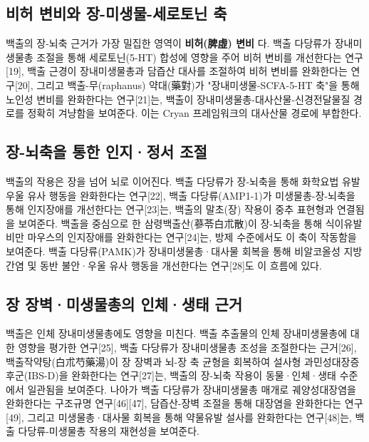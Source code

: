 \documentclass[11pt,oneside]{book}
\begin{document}
\subsection{비허 변비와 장-미생물-세로토닌 축}
백출의 장-뇌축 근거가 가장 밀집한 영역이 \textbf{비허(脾虛) 변비} 다. 백출 다당류가 장내미생물총 조절을 통해 세로토닌(5-HT) 합성에 영향을 주어 비허 변비를 개선한다는 연구[19], 백출 근경이 장내미생물총과 담즙산 대사를 조절하여 비허 변비를 완화한다는 연구[20], 그리고 백출-무(raphanus) 약대(藥對)가 "장내미생물-SCFA-5-HT 축"을 통해 노인성 변비를 완화한다는 연구[21]는, 백출이 장내미생물총-대사산물-신경전달물질 경로를 정확히 겨냥함을 보여준다. 이는 Cryan 프레임워크의 대사산물 경로에 부합한다.

\subsection{장-뇌축을 통한 인지·정서 조절}
백출의 작용은 장을 넘어 뇌로 이어진다. 백출 다당류가 장-뇌축을 통해 화학요법 유발 우울 유사 행동을 완화한다는 연구[22], 백출 다당류(AMP1-1)가 미생물총-장-뇌축을 통해 인지장애를 개선한다는 연구[23]는, 백출의 말초(장) 작용이 중추 표현형과 연결됨을 보여준다. 백출을 중심으로 한 삼령백출산(蔘苓白朮散)이 장-뇌축을 통해 식이유발비만 마우스의 인지장애를 완화한다는 연구[24]는, 방제 수준에서도 이 축이 작동함을 보여준다. 백출 다당류(PAMK)가 장내미생물총·대사물 회복을 통해 비알코올성 지방간염 및 동반 불안·우울 유사 행동을 개선한다는 연구[28]도 이 흐름에 있다.

\subsection{장 장벽·미생물총의 인체·생태 근거}
백출은 인체 장내미생물총에도 영향을 미친다. 백출 추출물의 인체 장내미생물총에 대한 영향을 평가한 연구[25], 백출 다당류가 장내미생물총 조성을 조절한다는 근거[26], 백출작약탕(白朮芍藥湯)이 장 장벽과 뇌-장 축 균형을 회복하여 설사형 과민성대장증후군(IBS-D)을 완화한다는 연구[27]는, 백출의 장-뇌축 작용이 동물·인체·생태 수준에서 일관됨을 보여준다. 나아가 백출 다당류가 장내미생물총 매개로 궤양성대장염을 완화한다는 구조규명 연구[46][47], 담즙산-장벽 조절을 통해 대장염을 완화한다는 연구[49], 그리고 미생물총·대사물 회복을 통해 약물유발 설사를 완화한다는 연구[48]는, 백출 다당류-미생물총 작용의 재현성을 보여준다.
\end{document}
